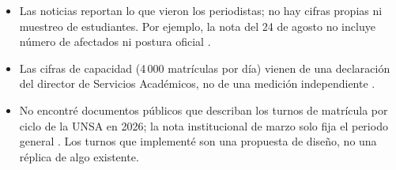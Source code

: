 \begin{itemize}
	\item Las noticias reportan lo que vieron los periodistas; no hay cifras propias ni muestreo de estudiantes. Por ejemplo, la nota del 24 de agosto no incluye número de afectados ni postura oficial \cite{elpueblo24}.
	\item Las cifras de capacidad (4\,000 matrículas por día) vienen de una declaración del director de Servicios Académicos, no de una medición independiente \cite{elpueblo25}.
	\item No encontré documentos públicos que describan los turnos de matrícula por ciclo de la UNSA en 2026; la nota institucional de marzo solo fija el periodo general \cite{unsa2026}. Los turnos que implementé son una propuesta de diseño, no una réplica de algo existente.
\end{itemize}

